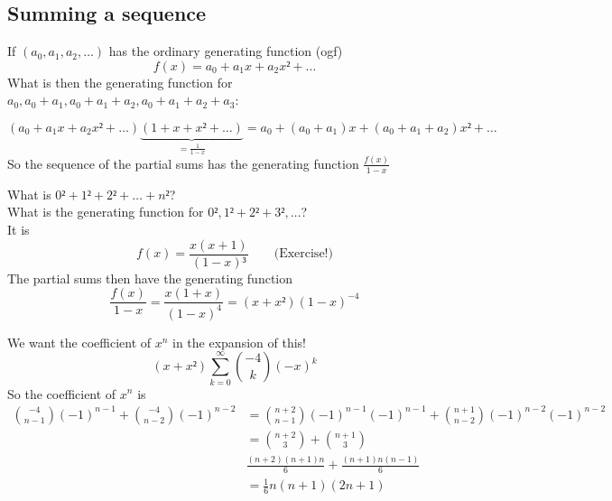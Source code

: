 \documentclass[english]{lbscript}
\begin{document}
\subsection{Summing a sequence}
\label{sec:summing-sequence}

If \((a_0, a_1, a_2, \dots)\) has the ordinary generating function (ogf)
\begin{equation}
	\label{eq:52}
	f(x) = a_0 + a_1x + a_2x²+\dots
\end{equation}
What is then the generating function for \(a_0, a_0+a_1, a_0+a_1+a_2, a_0+a_1+a_2+a_3\):

\begin{equation}
	\label{eq:53}
	\left(a_0+a_1x+a_2x²+\dots\right) \underbrace{\left(1+x+x²+\dots \right) }_{= \frac{1}{1-x}} = a_0 + (a_0+a_1)x+ (a_0+a_1+a_2)x²+\dots
\end{equation}
So the sequence of the partial sums has the generating function \(\frac{f(x)}{1-x}\)

\begin{example}{}{}
	What is \(0²+1²+2²+\dots+n²\)?\\
	What is the generating function for \(0²,1²+2²+3²,\dots\)?\\
	It is
	\begin{equation}
		\label{eq:55}
		f(x)= \frac{x(x+1)}{(1-x)³}\quad \quad \text{(Exercise!)}
	\end{equation}
	The partial sums then have the generating function
	\begin{equation}
		\label{eq:56}
		\frac{f(x)}{1-x} = \frac{x(1+x)}{(1-x)^{4}} = (x+x²)(1-x)^{-4}
	\end{equation}

	We want the coefficient of \(x^{n}\) in the expansion of this!\\
	\begin{equation}
		\label{eq:57}
		(x+x²) ∑_{k=0}^{∞} \binom{-4}{k} (-x)^{k}
	\end{equation}
	So the coefficient of \(x^{n}\) is
	\begin{align}
		\label{eq:58}
		\binom{-4}{n-1} (-1)^{n-1} + \binom{-4}{n-2} (-1)^{n-2}
		 & = \binom{n+2}{n-1} (-1)^{n-1}(-1)^{n-1} + \binom{n+1}{n-2} (-1)^{n-2} (-1)^{n-2} \\
		 & = \binom{n+2}{3} + \binom{n+1}{3}                                                \\
		 & \frac{(n+2)(n+1)n}{6} + \frac{(n+1)n(n-1)}{6}                                    \\
		 & = \frac{1}{6} n(n+1)(2n+1)
	\end{align}
\end{example}
\end{document}
